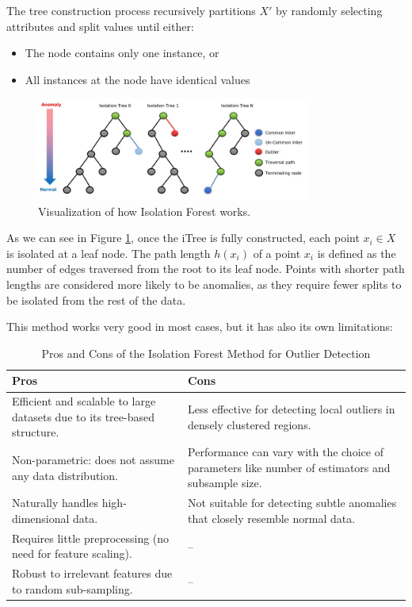 \documentclass[11pt,english,a4paper,hidelinks]{book}
\begin{document}
\noindent The tree construction process recursively partitions $X'$ by randomly selecting attributes and split values until either:
\begin{itemize}
    \item The node contains only one instance, or
    \item All instances at the node have identical values
\end{itemize}
\begin{figure}[H]
    \centering
    \includegraphics[width=0.8\textwidth]{images/code/outliers/IF.jpeg}
    \caption{Visualization of how Isolation Forest works.}
    \label{fig:isolation_forest}
\end{figure}

\noindent As we can see in Figure \ref{fig:isolation_forest}, once the iTree is fully constructed, each point $x_i \in X$ is isolated at a leaf node. The path length $h(x_i)$ of a point $x_i$ is defined as the number of edges traversed from the root to its leaf node. Points with shorter path lengths are considered more likely to be anomalies, as they require fewer splits to be isolated from the rest of the data.

\noindent This method works very good in most cases, but it has also its own limitations:

\begin{table}[H]
    \centering
    \begin{tabular}{|p{7cm}|p{7cm}|}
    \hline
    \textbf{Pros} & \textbf{Cons} \\
    \hline
    Efficient and scalable to large datasets due to its tree-based structure. & Less effective for detecting local outliers in densely clustered regions. \\
    \hline
    Non-parametric: does not assume any data distribution. & Performance can vary with the choice of parameters like number of estimators and subsample size. \\
    \hline
    Naturally handles high-dimensional data. & Not suitable for detecting subtle anomalies that closely resemble normal data. \\
    \hline
    Requires little preprocessing (no need for feature scaling). & -- \\
    \hline
    Robust to irrelevant features due to random sub-sampling. & -- \\
    \hline
    \end{tabular}
    \caption{Pros and Cons of the Isolation Forest Method for Outlier Detection}
\end{table}
\end{document}

